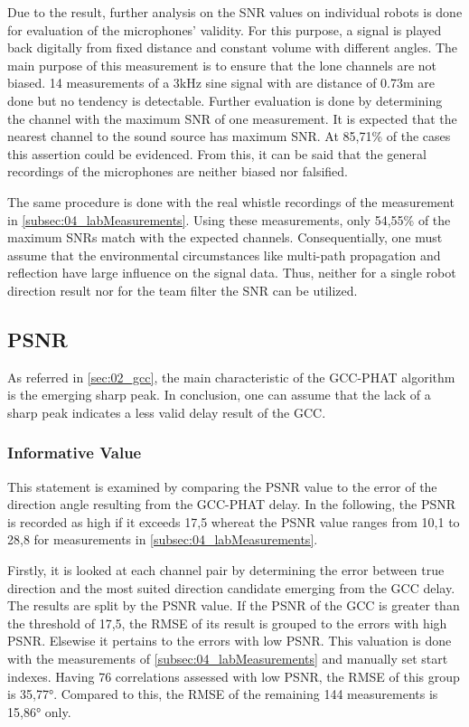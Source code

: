 Due to the result, further analysis on the \ac{SNR} values
on individual robots is done for evaluation of the microphones' validity.
For this purpose, a signal is played back digitally from fixed distance
and constant volume with different angles.
The main purpose of this measurement is to ensure that the lone channels
are not biased.
14 measurements of a 3\si{\kilo\hertz} sine signal
with are distance of 0.73\si{m} are done but no tendency is detectable.
Further evaluation is done by determining the channel with the maximum
\ac{SNR} of one measurement.
It is expected that the nearest channel to the sound source has maximum \ac{SNR}.
At 85,71\si{\percent} of the cases this assertion could be evidenced.
From this, it can be said that the general recordings of the microphones
are neither biased nor falsified.

The same procedure is done with the real whistle recordings of the
measurement in \ref{subsec:04_labMeasurements}.
Using these measurements, only 54,55\si{\percent} of the maximum \acp{SNR}
match with the expected channels.
Consequentially, one must assume that the environmental circumstances
like multi-path propagation and reflection have large influence
on the signal data.
Thus, neither for a single robot direction result nor for the team filter
the \ac{SNR} can be utilized.

\subsection{PSNR}
\label{subsec:04_psnr}

As referred in \cref{sec:02_gcc}, the main characteristic of the \ac{GCC-PHAT}
algorithm is the emerging sharp peak.
In conclusion, one can assume that the lack of a sharp peak indicates
a less valid delay result of the \ac{GCC}.

\subsubsection*{Informative Value}

This statement is examined by comparing the \ac{PSNR} value
to the error of the direction angle resulting from the \ac{GCC-PHAT} delay.
In the following, the \ac{PSNR} is recorded as high if it exceeds 17,5 whereat the
\ac{PSNR} value ranges from 10,1 to 28,8 for measurements in
\cref{subsec:04_labMeasurements}.

Firstly, it is looked at each channel pair by determining the
error between true direction and the most suited direction candidate emerging
from the \ac{GCC} delay.
The results are split by the \ac{PSNR} value.
If the \ac{PSNR} of the \ac{GCC} is greater than the threshold of 17,5,
the \ac{RMSE} of its result is grouped to the errors with high \ac{PSNR}.
Elsewise it pertains to the errors with low \ac{PSNR}.
This valuation is done with the measurements of \cref{subsec:04_labMeasurements}
and manually set start indexes.
Having 76 correlations assessed with low \ac{PSNR}, the \ac{RMSE} of this group
is 35,77\si{\degree}.
Compared to this, the \ac{RMSE} of the remaining 144 measurements
is 15,86\si{\degree} only.

